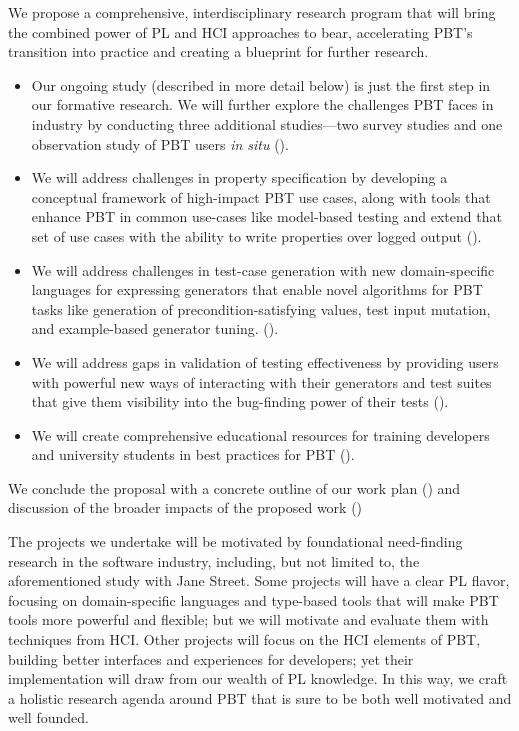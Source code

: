 We propose a comprehensive, interdisciplinary research program that
will bring the combined power of PL and HCI approaches to bear,
accelerating PBT's transition into practice\iflater{} and creating a blueprint for further research\fi.
\begin{itemize}[noitemsep]
  \item
  Our ongoing study (described in more detail below) is
  just the first step in our formative research.
  We will further explore the challenges PBT faces in
  industry by conducting three additional
  studies---two\iflater{}\fi{} survey studies and one
  observation study of
  PBT users {\em in situ} ().
  \item We will address challenges in property specification by developing a
  conceptual framework of high-impact PBT use cases, along with tools that
  enhance PBT in common use-cases like model-based testing and extend that set
  of use cases with the ability to write properties over logged output
  ().
  \item We will address challenges in test-case generation with new
  domain-specific languages for expressing generators that enable novel
  algorithms for PBT tasks like generation of precondition-satisfying values,
  test input mutation, and example-based generator tuning.
  ().
  \item We will address gaps in validation of testing effectiveness by providing
  users with powerful new ways of interacting with their generators and test
  suites that give them visibility into the bug-finding power of their tests
  ().
  \item We will create comprehensive educational resources for training developers and
  university students in best practices for PBT ().
\end{itemize}
We conclude the proposal with a concrete outline of our work plan
() and discussion of the broader impacts of the
proposed work ()

\iflater{}\fi
The projects we undertake will be motivated by
foundational need-finding research in the software industry, including, but not
limited to, the aforementioned study with Jane Street. Some projects will have a
clear PL flavor, focusing on domain-specific languages and type-based tools that
will make PBT tools more powerful and flexible; but we will motivate and
evaluate them with techniques from HCI. Other projects will focus on the HCI elements
of PBT, building better interfaces and experiences for developers; yet their
implementation will draw from our wealth of PL knowledge. In this way, we craft
a holistic research agenda around PBT that is sure to be both well motivated and
well founded.

